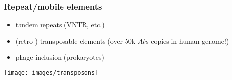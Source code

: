 %
\begin{frame}
  \frametitle{Repeat/mobile elements}
  \begin{itemize}
    \item tandem repeats (VNTR, etc.)
    \item (retro-) transposable elements (over 50k $Alu$ copies in human genome!)
    \item phage inclusion (prokaryotes)
  \end{itemize}
  \begin{center}  
    \texttt{[image: images/transposons]}
  \end{center}
\end{frame}